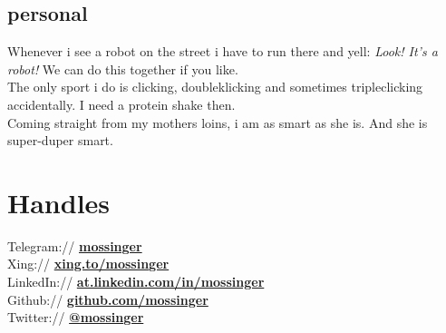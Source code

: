 \documentclass[]{resume}
\begin{document}
\begin{minipage}[t]{0.33\textwidth}
	\subsection{personal}
	Whenever i see a robot on the street i have to run there and yell: \textit{Look! It's a robot!} We can do this together if you like. \\ \sectionsep
	The only sport i do is clicking, doubleklicking and sometimes tripleclicking accidentally. I need a protein shake then. \\ \sectionsep 
	Coming straight from my mothers loins, i am as smart as she is. And she is super-duper smart. 
	\sectionsep
\section{Handles} 
	Telegram:// \href{https://telegram.me/no_user}{\textbf{mossinger}} \\ \smallsep 
	Xing:// \href{https://www.xing.com/profile/no_profile}{\textbf{xing.to/mossinger}} \\ \smallsep 
	LinkedIn:// \href{https://www.linkedin.com/in/no_profile}{\textbf{at.linkedin.com/in/mossinger}} \\ \smallsep 
	Github:// \href{https://github.com/no_profile}{\textbf{github.com/mossinger}} \\ \smallsep 
	Twitter:// \href{https://twitter.com/no_profile}{\textbf{@mossinger}} \\ \smallsep 

\end{minipage}\quad %
\end{document}
